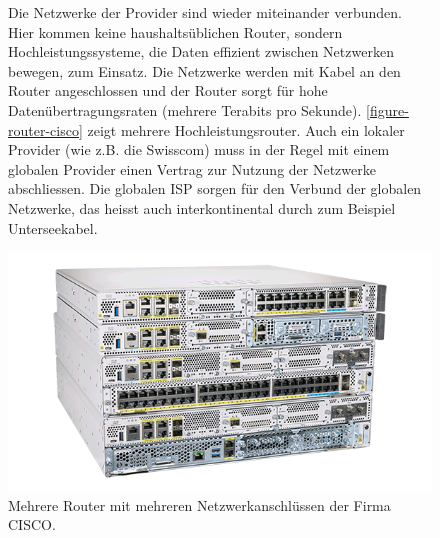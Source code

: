 \begin{figure}[htb]
\centering
\begin{minipage}{0.6\textwidth}
Die Netzwerke der Provider sind wieder miteinander verbunden. Hier kommen keine haushaltsüblichen Router, sondern Hochleistungssysteme, die Daten effizient zwischen Netzwerken bewegen, zum Einsatz. Die Netzwerke werden mit Kabel an den Router angeschlossen und der Router sorgt für hohe Datenübertragungsraten (mehrere Terabits pro Sekunde). \autoref{figure-router-cisco} zeigt mehrere Hochleistungsrouter. Auch ein lokaler Provider (wie z.B. die Swisscom) muss in der Regel mit einem globalen Provider einen Vertrag zur Nutzung der Netzwerke abschliessen. Die globalen \ac{ISP} sorgen für den Verbund der globalen Netzwerke, das heisst auch interkontinental durch zum Beispiel Unterseekabel.
\end{minipage}
\hfill
\begin{minipage}{0.35\textwidth}
\centering
\includegraphics[scale=0.25]{cisco_router}
\caption{Mehrere Router mit mehreren Netzwerkanschlüssen der Firma CISCO.}
\label{figure-router-cisco}
\end{minipage}
\end{figure}